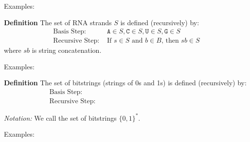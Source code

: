 \documentclass[12pt, oneside]{article}
\newcommand{\A}[0]{\texttt{A}}
\newcommand{\C}[0]{\texttt{C}}
\newcommand{\G}[0]{\texttt{G}}
\newcommand{\U}[0]{\texttt{U}}
\begin{document}
Examples: 

\vfill

{\bf Definition} The set of RNA strands $S$ is defined (recursively) by:
\[
\begin{array}{ll}
\textrm{Basis Step: } & \A \in S, \C \in S, \U \in S, \G \in S \\
\textrm{Recursive Step: } & \textrm{If } s \in S\textrm{ and }b \in B \textrm{, then }sb \in S
\end{array}
\]
where $sb$ is string concatenation.

Examples: 

\vfill

{\bf Definition} The set of bitstrings (strings of 0s and 1s) is defined (recursively) by:
\[
\begin{array}{ll}
\textrm{Basis Step: } & \phantom{\lambda \in X} \\
\textrm{Recursive Step: } & \phantom{\textrm{If } s \in X \textrm{, then } s0 \in X \text{ and } s1 \in X}
\end{array}
\]

{\it Notation:} We call the set of bitstrings $\{0,1\}^*$.

Examples: 

\vfill \vfill
\end{document}
